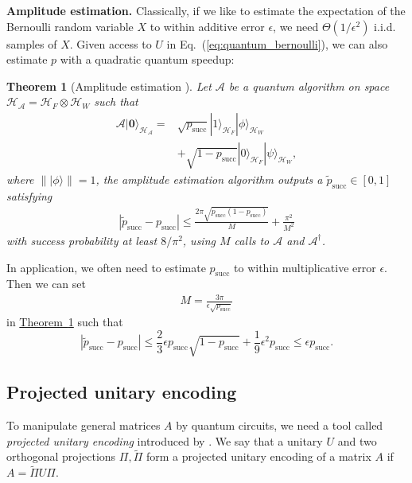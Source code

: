 \documentclass[journal]{IEEEtran}
\newtheorem{theorem}{Theorem}
\newcommand{\eq}[1]{Eq.~(\ref{eq:#1})}
\newcommand{\thm}[1]{\hyperref[thm:#1]{Theorem~\ref*{thm:#1}}}
\begin{document}
\vspace{3mm}
\noindent
\textbf{Amplitude estimation.}
Classically, if we like to estimate the expectation of the Bernoulli random variable $X$ to within additive error $\epsilon$, we need $\Theta(1/\epsilon^2)$ i.i.d. samples of $X$. Given access to $U$ in \eq{quantum_bernoulli}, we can also estimate $p$ with a quadratic quantum speedup:
\begin{theorem} [Amplitude estimation {\cite[Theorem 12]{brassard2002quantum}}]
  \label{thm:amplitude_estimation}
    Let $\mathcal{A}$ be a quantum algorithm on space $\mathcal{H}_{\mathcal{A}} = \mathcal{H}_F\otimes \mathcal{H}_W$ such that
    \begin{align}
    \mathcal{A}|\mathbf{0}\rangle_{\mathcal{H}_{\mathcal{A}}}=&\sqrt{p_{\mathrm{succ}}}|1\rangle_{\mathcal{H}_F}|\phi\rangle_{\mathcal{H}_W}\nonumber\\&+\sqrt{1-p_{\mathrm{succ}}}|0\rangle_{\mathcal{H}_F}|\psi\rangle_{\mathcal{H}_W},
    \end{align}
    where $\||\phi\rangle \|=1$, the amplitude estimation algorithm outputs a $\tilde{p}_{\mathrm{succ}} \in[0,1]$ satisfying
  \begin{align}
    |\tilde{p}_{\mathrm{succ}}-p_{\mathrm{succ}}| \leq \frac{2 \pi \sqrt{p_{\mathrm{succ}}(1-p_{\mathrm{succ}})}}{M}+\frac{\pi^{2}}{M^{2}}
  \end{align}
  with success probability at least $8 / \pi^{2}$, using $M$ calls to $\mathcal{A}$ and $\mathcal{A}^{\dagger}$.
\end{theorem}

In application, we often need to estimate $p_{\text{succ}}$ to within multiplicative error $\epsilon$. Then we can set
\begin{align}
\label{eq:M_mul}
M = \frac{3\pi}{\epsilon\sqrt{p_{\text{succ}}}}
\end{align}
in \thm{amplitude_estimation} such that
\begin{equation}
  |\tilde{p}_{\text{succ}}-p_{\text{succ}}| \le \frac{2}{3}\epsilon p_{\mathrm{succ}} \sqrt{1-p_{\mathrm{succ}}} + \frac{1}{9}\epsilon^2 p_{\mathrm{succ}} \le \epsilon p_{\mathrm{succ}} .
\end{equation}


\subsection{Projected unitary encoding}
To manipulate general matrices $A$ by quantum circuits, we need a tool called \textit{projected unitary encoding} introduced by \cite{gilyen2019singular}. We say that a unitary $U$ and two orthogonal projections $\Pi, \widetilde{\Pi}$ form a projected unitary encoding of a matrix $A$ if $A=\widetilde{\Pi}U\Pi$.
\end{document}
